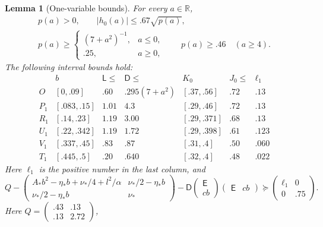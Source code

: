 \documentclass[11pt]{article}
\newtheorem{lemma}[theorem]{Lemma}
\theoremstyle{definition}
\theoremstyle{remark}
\numberwithin{equation}{section}
\begin{document}
\begin{lemma}[One-variable bounds]\label{sc:bounds}
For every $a\in\mathbb R$,
\begin{equation}\label{sc:p-h-bounds}
 \begin{gathered}
 p(a)>0,\qquad |h_0(a)|\le .67\sqrt{p(a)},\\
 p(a)\ge\begin{cases}(7+a^2)^{-1},&a\le0,\\ .25,&a\ge0,\end{cases}
 \qquad p(a)\ge .46\quad(a\ge4).
 \end{gathered}
\end{equation}
The following interval bounds hold:
\begin{equation}\label{sc:interval-table}
\begin{array}{c|cccccc}
 &b&\mathsf L\le&\mathsf D\le&K_0&J_0\le&\ell_1\\\hline
 O &[0,.09]&.60&.295(7+a^2)&[.37,.56]&.72&.13\\
 P_1 &[.083,.15]&1.01&4.3&[.29,.46]&.72&.13\\
 R_1 &[.14,.23]&1.19&3.00&[.29,.371]&.68&.13\\
 U_1 &[.22,.342]&1.19&1.72&[.29,.398]&.61&.123\\
 V_1 &[.337,.45]&.83&.87&[.31,.4]&.50&.060\\
 T_1 &[.445,.5]&.20&.640&[.32,.4]&.48&.022
\end{array}
\end{equation}
Here $\ell_1$ is the positive number in the last column, and
\begin{equation}\label{sc:local-surplus}
 Q-
 \begin{pmatrix}
 A_*b^2-\eta_*b+\nu_*/4+l^2/\alpha&\nu_*/2-\eta_*b\\
 \nu_*/2-\eta_*b&\nu_*
 \end{pmatrix}
 -\mathsf D
 \begin{pmatrix}\mathsf E\\cb\end{pmatrix}
 \begin{pmatrix}\mathsf E&cb\end{pmatrix}
 \succeq\begin{pmatrix}\ell_1&0\\0&.75\end{pmatrix}.
\end{equation}
Here $Q=\left(\begin{smallmatrix}.43&.13\\.13&2.72\end{smallmatrix}\right)$,

\end{lemma}
\end{document}
